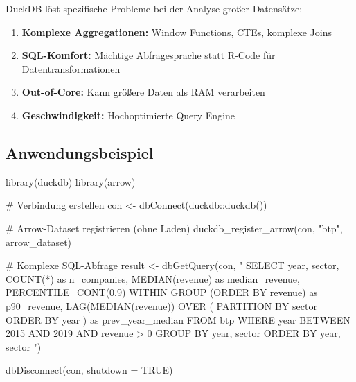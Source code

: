 \documentclass[
  ngerman,
  10pt,
  letterpaper,
  twocolumn]{book}
\newenvironment{Shaded}{\begin{snugshade}}{\end{snugshade}}
\newcommand{\AttributeTok}[1]{\textcolor[rgb]{0.40,0.45,0.13}{#1}}
\newcommand{\CommentTok}[1]{\textcolor[rgb]{0.37,0.37,0.37}{#1}}
\newcommand{\ConstantTok}[1]{\textcolor[rgb]{0.56,0.35,0.01}{#1}}
\newcommand{\FunctionTok}[1]{\textcolor[rgb]{0.28,0.35,0.67}{#1}}
\newcommand{\NormalTok}[1]{\textcolor[rgb]{0.00,0.23,0.31}{#1}}
\newcommand{\OtherTok}[1]{\textcolor[rgb]{0.00,0.23,0.31}{#1}}
\newcommand{\SpecialCharTok}[1]{\textcolor[rgb]{0.37,0.37,0.37}{#1}}
\newcommand{\StringTok}[1]{\textcolor[rgb]{0.13,0.47,0.30}{#1}}
\providecommand{\tightlist}{%
  \setlength{\itemsep}{0pt}\setlength{\parskip}{0pt}}
\begin{document}
DuckDB löst spezifische Probleme bei der Analyse großer Datensätze:

\begin{enumerate}
\def\labelenumi{\arabic{enumi}.}
\tightlist
\item
  \textbf{Komplexe Aggregationen:} Window Functions, CTEs, komplexe
  Joins
\item
  \textbf{SQL-Komfort:} Mächtige Abfragesprache statt R-Code für
  Datentransformationen
\item
  \textbf{Out-of-Core:} Kann größere Daten als RAM verarbeiten
\item
  \textbf{Geschwindigkeit:} Hochoptimierte Query Engine
\end{enumerate}

\subsection{Anwendungsbeispiel}\label{anwendungsbeispiel}

\begin{Shaded}
\begin{Highlighting}[]
\FunctionTok{library}\NormalTok{(duckdb)}
\FunctionTok{library}\NormalTok{(arrow)}

\CommentTok{\# Verbindung erstellen}
\NormalTok{con }\OtherTok{\textless{}{-}} \FunctionTok{dbConnect}\NormalTok{(duckdb}\SpecialCharTok{::}\FunctionTok{duckdb}\NormalTok{())}

\CommentTok{\# Arrow{-}Dataset registrieren (ohne Laden)}
\FunctionTok{duckdb\_register\_arrow}\NormalTok{(con, }\StringTok{"btp"}\NormalTok{, arrow\_dataset)}

\CommentTok{\# Komplexe SQL{-}Abfrage}
\NormalTok{result }\OtherTok{\textless{}{-}} \FunctionTok{dbGetQuery}\NormalTok{(con, }\StringTok{"}
\StringTok{  SELECT }
\StringTok{    year,}
\StringTok{    sector,}
\StringTok{    COUNT(*) as n\_companies,}
\StringTok{    MEDIAN(revenue) as median\_revenue,}
\StringTok{    PERCENTILE\_CONT(0.9) WITHIN GROUP (ORDER BY revenue) as p90\_revenue,}
\StringTok{    LAG(MEDIAN(revenue)) OVER (}
\StringTok{      PARTITION BY sector }
\StringTok{      ORDER BY year}
\StringTok{    ) as prev\_year\_median}
\StringTok{  FROM btp}
\StringTok{  WHERE year BETWEEN 2015 AND 2019}
\StringTok{    AND revenue \textgreater{} 0}
\StringTok{  GROUP BY year, sector}
\StringTok{  ORDER BY year, sector}
\StringTok{"}\NormalTok{)}

\FunctionTok{dbDisconnect}\NormalTok{(con, }\AttributeTok{shutdown =} \ConstantTok{TRUE}\NormalTok{)}
\end{Highlighting}
\end{Shaded}
\end{document}
